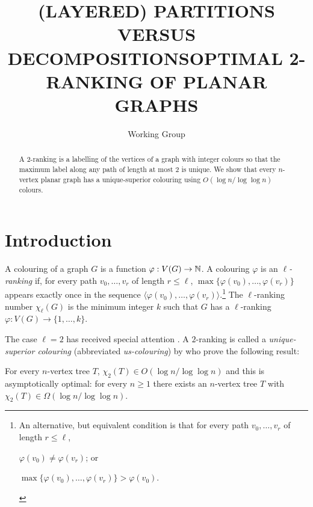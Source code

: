 \documentclass[kpfonts]{patmorin}
\title{\MakeUppercase{(Layered) Partitions versus Decompositions}}
\author{}
\title{\MakeUppercase{Optimal 2-Ranking of Planar Graphs}}
\author{Working Group}
\newcommand{\uqs}{\chi_2}
\begin{document}
\maketitle

\begin{abstract}
  A 2-ranking is a labelling of the vertices of a graph with integer colours so that the maximum label along any path of length at most 2 is unique.  We show that every $n$-vertex planar graph has a unique-superior colouring using $O(\log n/\log\log n)$ colours.
\end{abstract}



\section{Introduction}


A colouring of a graph $G$ is a function $\varphi:V(G)\to \mathbb{N}$.  A colouring $\varphi$ is an \emph{$\ell$-ranking} if, for every path $v_0,\ldots,v_r$ of length $r\le\ell$, $\max\{\varphi(v_0),\ldots,\varphi(v_r)\}$ appears exactly once in the sequence $\langle \varphi(v_0),\ldots,\varphi(v_r)\rangle$.\footnote{An alternative, but equivalent condition is that for every path $v_0,\ldots,v_r$ of length $r\le\ell$,
\begin{inparaenum}[(i)]
   \item $\varphi(v_0)\neq \varphi(v_r)$; or
   \item $\max\{\varphi(v_0),\ldots,\varphi(v_r)\} > \varphi(v_0)$.
\end{inparaenum}
}
The $\ell$-ranking number $\chi_\ell(G)$ is the minimum integer $k$ such that $G$ has a $\ell$-ranking $\varphi:V(G)\to \{1,\ldots,k\}$.

The case $\ell=2$ has received special attention \cite{almeter.demircan.ea:graph,karpas.neiman.ea:on}. A $2$-ranking is called a \emph{unique-superior colouring} (abbreviated \emph{us-colouring}) by \citet{karpas.neiman.ea:on} who prove the following result:

\setcounter{thm}{-1}
\begin{thm}\label{trees}
    For every $n$-vertex tree $T$, $\uqs(T)\in O(\log n/\log\log n)$ and this is asymptotically optimal: for every $n\ge 1$ there exists an $n$-vertex tree $T$ with $\uqs(T)\in\Omega(\log n/\log\log n)$.
\end{thm}
\end{document}
